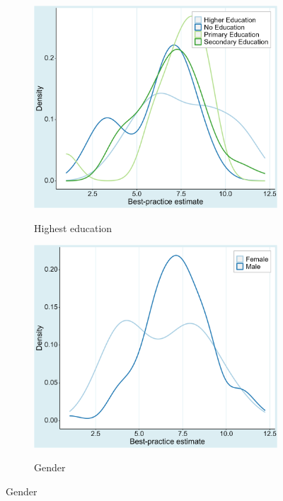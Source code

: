 \begin{figure}[!htbp]
\begin{center}
    \begin{subfigure}[!htbp]{0.38\textwidth}
      \vspace{0.2cm}
      \caption{Highest education}
      \vspace{-0.1cm}
      \includegraphics[width=0.95\linewidth]{Figures/BPE/bpe_education.png}
      \label{fig:bpe_education}
    \end{subfigure}
    \begin{subfigure}[!htbp]{0.38\textwidth}
      \vspace{0.2cm}
      \caption{Gender}
      \vspace{-0.1cm}
      \includegraphics[width=0.95\linewidth]{Figures/BPE/bpe_gender.png}
      \label{fig:bpe_gender}
    \end{subfigure}


\end{center}
\end{figure}
